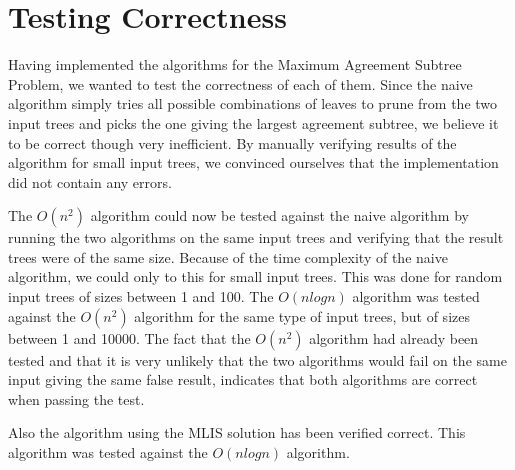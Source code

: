 \chapter{Testing Correctness}
Having implemented the algorithms for the Maximum Agreement Subtree Problem, we wanted to test the correctness of each of them. Since the naive algorithm simply tries all possible combinations of leaves to prune from the two input trees and picks the one giving the largest agreement subtree, we believe it to be correct though very inefficient. By manually verifying results of the algorithm for small input trees, we convinced ourselves that the implementation did not contain any errors.

The $O(n^2)$ algorithm could now be tested against the naive algorithm by running the two algorithms on the same input trees and verifying that the result trees were of the same size. Because of the time complexity of the naive algorithm, we could only to this for small input trees. This was done for random input trees of sizes between 1 and 100. The $O(nlogn)$ algorithm was tested against the $O(n^2)$ algorithm for the same type of input trees, but of sizes between 1 and 10000. The fact that the $O(n^2)$ algorithm had already been tested and that it is very unlikely that the two algorithms would fail on the same input giving the same false result, indicates that both algorithms are correct when passing the test.

Also the algorithm using the MLIS solution has been verified correct. This algorithm was tested against the $O(nlogn)$ algorithm.